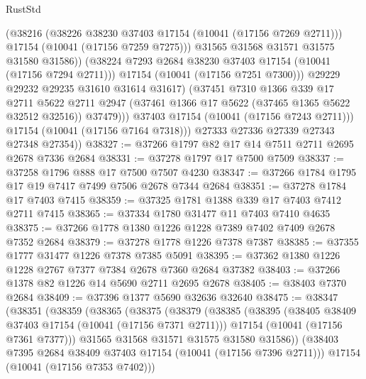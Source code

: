 \begin{lexlean}{RustStd}
\begin{coremodule}
                        (@38216
                          (@38226 @38230 @37403 @17154 (@10041 (@17156 @7269 @2711)))
                          @17154
                          (@10041 (@17156 @7259 @7275)))
                        @31565
                        @31568
                        @31571
                        @31575
                        @31580
                        @31586))
                    (@38224 @7293 @2684 @38230 @37403 @17154 (@10041 (@17156 @7294 @2711)))
                    @17154
                    (@10041 (@17156 @7251 @7300)))
                  @29229
                  @29232
                  @29235
                  @31610
                  @31614
                  @31617)
                (@37451
                  @7310
                  @1366
                  @339
                  @17
                  @2711
                  @5622
                  @2711
                  @2947
                  (@37461 @1366 @17 @5622 (@37465 @1365 @5622 @32512 @32516))
                  @37479)))
            @37403
            @17154
            (@10041 (@17156 @7243 @2711)))
          @17154
          (@10041 (@17156 @7164 @7318)))
        @27333
        @27336
        @27339
        @27343
        @27348
        @27354))
@38327 := @37266 @1797 @82 @17 @14 @7511 @2711 @2695 @2678 @7336 @2684
@38331 := @37278 @1797 @17 @7500 @7509
@38337 := @37258 @1796 @888 @17 @7500 @7507 @4230
@38347 := @37266 @1784 @1795 @17 @19 @7417 @7499 @7506 @2678 @7344 @2684
@38351 := @37278 @1784 @17 @7403 @7415
@38359 := @37325 @1781 @1388 @339 @17 @7403 @7412 @2711 @7415
@38365 := @37334 @1780 @31477 @11 @7403 @7410 @4635
@38375 := @37266 @1778 @1380 @1226 @1228 @7389 @7402 @7409 @2678 @7352 @2684
@38379 := @37278 @1778 @1226 @7378 @7387
@38385 := @37355 @1777 @31477 @1226 @7378 @7385 @5091
@38395 := @37362 @1380 @1226 @1228 @2767 @7377 @7384 @2678 @7360 @2684 @37382
@38403 := @37266 @1378 @82 @1226 @14 @5690 @2711 @2695 @2678
@38405 := @38403 @7370 @2684
@38409 := @37396 @1377 @5690 @32636 @32640
@38475 := @38347
    (@38351
      (@38359
        (@38365
          (@38375
            (@38379
              (@38385
                (@38395
                  (@38405 @38409 @37403 @17154 (@10041 (@17156 @7371 @2711)))
                  @17154
                  (@10041 (@17156 @7361 @7377)))
                @31565
                @31568
                @31571
                @31575
                @31580
                @31586))
            (@38403 @7395 @2684 @38409 @37403 @17154 (@10041 (@17156 @7396 @2711)))
            @17154
            (@10041 (@17156 @7353 @7402)))

\end{coremodule}
\end{lexlean}
